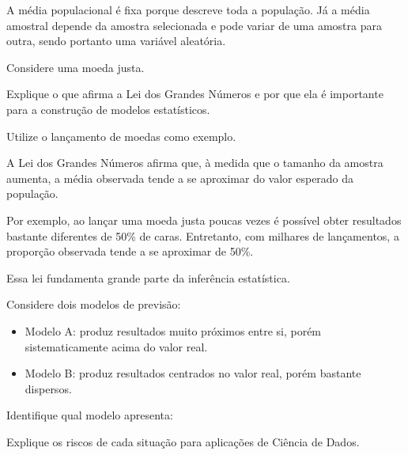 \documentclass[a4paper,12pt,addpoints]{exam}
\begin{document}
\begin{questions}
\begin{solution}
			A média populacional é fixa porque descreve toda a população. Já a média amostral depende da amostra selecionada e pode variar de uma amostra para outra, sendo portanto uma variável aleatória.
		\end{solution}
		
		\question[1]
		
		Considere uma moeda justa.
		
		Explique o que afirma a Lei dos Grandes Números e por que ela é importante para a construção de modelos estatísticos.
		
		Utilize o lançamento de moedas como exemplo.
		
		\begin{solution}
			A Lei dos Grandes Números afirma que, à medida que o tamanho da amostra aumenta, a média observada tende a se aproximar do valor esperado da população.
			
			Por exemplo, ao lançar uma moeda justa poucas vezes é possível obter resultados bastante diferentes de 50\% de caras. Entretanto, com milhares de lançamentos, a proporção observada tende a se aproximar de 50\%.
			
			Essa lei fundamenta grande parte da inferência estatística.
		\end{solution}
		
		\question[1]
		
		Considere dois modelos de previsão:
		
		\begin{itemize}
			\item Modelo A: produz resultados muito próximos entre si, porém sistematicamente acima do valor real.
			\item Modelo B: produz resultados centrados no valor real, porém bastante dispersos.
		\end{itemize}
		
		Identifique qual modelo apresenta:
		
		
		Explique os riscos de cada situação para aplicações de Ciência de Dados.
		

\end{questions}
\end{document}

